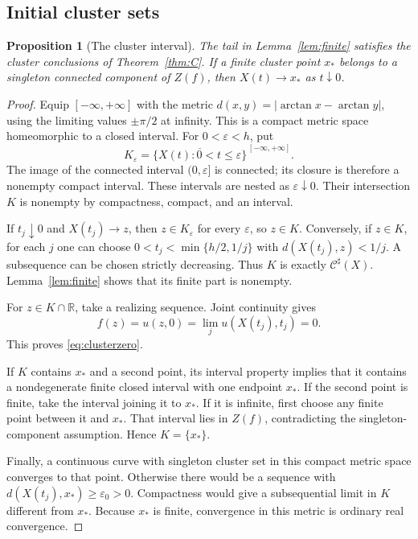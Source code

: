 \documentclass[11pt,reqno]{amsart}
\numberwithin{equation}{section}
\newtheorem{proposition}[theorem]{Proposition}
\theoremstyle{definition}
\theoremstyle{remark}
\newcommand{\R}{\mathbb R}
\begin{document}
\subsection{Initial cluster sets}\label{sec:cluster}
\begin{proposition}[The cluster interval]\label{prop:cluster}
The tail in Lemma~\ref{lem:finite} satisfies the cluster conclusions of Theorem~\ref{thm:C}. If a finite cluster point $x_*$ belongs to a singleton connected component of $Z(f)$, then $X(t)\to x_*$ as $t\downarrow0$.
\end{proposition}
\begin{proof}
Equip $[-\infty,+\infty]$ with the metric $d(x,y)=|\arctan x-\arctan y|$, using the limiting values $\pm\pi/2$ at infinity. This is a compact metric space homeomorphic to a closed interval. For $0<\varepsilon<h$, put
\[
 K_\varepsilon=\overline{\{X(t):0<t\leq\varepsilon\}}^{\,[-\infty,+\infty]}.
\]
The image of the connected interval $(0,\varepsilon]$ is connected; its closure is therefore a nonempty compact interval. These intervals are nested as $\varepsilon\downarrow0$. Their intersection $K$ is nonempty by compactness, compact, and an interval.

If $t_j\downarrow0$ and $X(t_j)\to z$, then $z\in K_\varepsilon$ for every $\varepsilon$, so $z\in K$. Conversely, if $z\in K$, for each $j$ one can choose $0<t_j<\min\{h/2,1/j\}$ with $d(X(t_j),z)<1/j$. A subsequence can be chosen strictly decreasing. Thus $K$ is exactly $\mathcal C^\sharp(X)$. Lemma~\ref{lem:finite} shows that its finite part is nonempty.

For $z\in K\cap\R$, take a realizing sequence. Joint continuity gives
\[
 f(z)=u(z,0)=\lim_j u(X(t_j),t_j)=0.
\]
This proves \eqref{eq:clusterzero}.

If $K$ contains $x_*$ and a second point, its interval property implies that it contains a nondegenerate finite closed interval with one endpoint $x_*$. If the second point is finite, take the interval joining it to $x_*$. If it is infinite, first choose any finite point between it and $x_*$. That interval lies in $Z(f)$, contradicting the singleton-component assumption. Hence $K=\{x_*\}$.

Finally, a continuous curve with singleton cluster set in this compact metric space converges to that point. Otherwise there would be a sequence with $d(X(t_j),x_*)\geq\varepsilon_0>0$. Compactness would give a subsequential limit in $K$ different from $x_*$. Because $x_*$ is finite, convergence in this metric is ordinary real convergence.
\end{proof}
\end{document}
